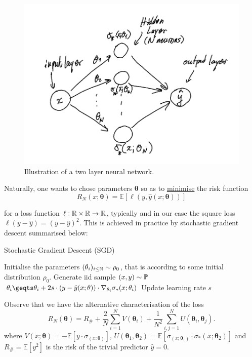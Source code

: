 \documentclass{article}
\begin{document}
\begin{figure}[H]
    \centering
    \includegraphics[width=0.6\linewidth]{images/Two-layer-NN.png}
    \caption{ Illustration of a two layer neural network.}
    \label{fig: two layer neural net}
\end{figure}


Naturally, one wants to chose parameters $\mathbf{\theta}$ so as to \underline{minimise} the risk function 
\begin{equation}\label{eq: risk}
	R_{N}(x;\mathbf{\theta}) =\mathbb{E}[\ell(y, \hat{y}(x;\mathbf{\theta}))]
\end{equation}

for a loss function $ \ell:\mathbb{R}\times \mathbb{R} \to \mathbb{R}$, typically and in our case the square loss $ \ell(y-\hat{y})  = (y-\hat{y})^{2}$. This is achieved in practice by stochastic gradient descent summarised below:

\begin{codeblock}{Stochastic Gradient Descent (SGD)}\label{alg: SGD}
\begin{algorithmic}
\State Initialise the parameters $(\mathbf{\theta}_{i})_{i\leq \mathbb{N}} \sim \rho_{0}$, that is according to some initial distribution $ \rho_{0}$.
\State Generate iid sample $ (x, y)\sim \mathbb{P}$
\State $\mathbf{\theta}_{i}\geqts\mathbf{\theta}_{i}+2s\cdot (y-\hat{y}(x;\mathbf{\theta}))\cdot \nabla_{\mathbf{\theta}_{i}}\sigma_{*}(x;\mathbf{\theta}_i)$ 
\State Update learning rate $ s$
\EndFor
\EndWhile
\end{algorithmic}

\end{codeblock}

Observe that we have the alternative characterisation of the loss
\begin{equation}\label{eq: loss expanded}
	R_{N}(\mathbf{\theta}) = R_{\#}+ \frac{2}{N}\displaystyle\sum^{N}_{i=1}V(\mathbf{\theta}_{i})+\frac{1}{N^{2}}\displaystyle\sum^{N}_{i,j=1}U(\mathbf{\theta}_{i},\mathbf{\theta}_{j}).
\end{equation} 
where $ V(x; \mathbf{\theta}) = -\mathbb{E}[y\cdot \sigma_(x: \mathbf{\theta})]$, $ U( \mathbf{\theta}_{1}, \mathbf{\theta}_{2}) =\mathbb{E}[\sigma_(x; \mathbf{\theta}_{1})\cdot \sigma_*(x; \mathbf{\theta}_{2})]$ and $ R_{\#}=\mathbb{E}[y^{2}]$ is the risk of the trivial predictor $ \hat{y} = 0$.\\ 
\end{document}
